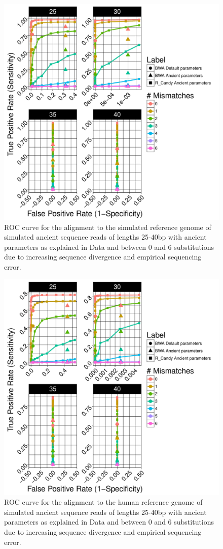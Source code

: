 \documentclass[11pt,a4paper]{report}
\begin{document}
\begin{figure}[H]
\centering
\includegraphics[width=12cm]{pictures/bROC_DS1_ART.pdf}
\caption{
ROC curve for the alignment to the simulated reference genome of simulated ancient 
sequence reads of lengths 25-40bp with ancient parameters as explained in Data 
and between 0 and 6 substitutions due to increasing sequence divergence and
empirical sequencing error.
}
\label{DS1_ART}
\end{figure}



\begin{figure}[H]
\centering
\includegraphics[width=12cm]{pictures/bROC_DS4_ART.pdf}
\caption{
ROC curve for the alignment to the human reference genome of simulated ancient 
sequence reads of lengths 25-40bp with ancient parameters as explained in Data 
and between 0 and 6 substitutions due to increasing sequence divergence and
empirical sequencing error.
}
\label{DS4_ART}
\end{figure}





\end{document}
